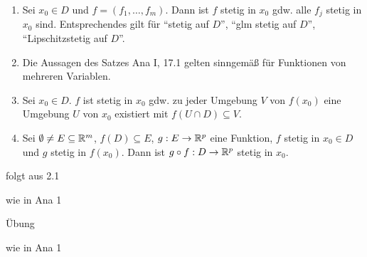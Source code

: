 \documentclass[a4paper,oneside,DIV15,BCOR12mm,chapterprefix=true,headings=onelinechapter]{scrbook}
\begin{document}
\begin{satz}
\begin{enumerate}
\item Sei $x_0 \in D$ und $f = (f_1,\ldots,f_m).$ Dann ist $f$ stetig in $x_0$ gdw. alle $f_j$ stetig in $x_0$ sind. Entsprechendes gilt für "`stetig auf $D$"', "`glm stetig auf $D$"', "`Lipschitzstetig auf $D$"'.
\item Die Aussagen des Satzes Ana I, 17.1 gelten sinngemäß für Funktionen von mehreren Variablen.
\item Sei $x_0 \in D$. $f$ ist stetig in $x_0$ gdw. zu jeder Umgebung $V$ von $f(x_0)$ eine Umgebung $U$ von $x_0$ existiert mit $f(U \cap D) \subseteq V$.
\item Sei $\emptyset \ne E \subseteq \mathbb{R}^m$, $f(D) \subseteq E$, $g: E \to \mathbb{R}^p$ eine Funktion, $f$ stetig in $x_0 \in D$ und $g$ stetig in $f(x_0)$. Dann ist $g \circ f: D \to \mathbb{R}^p$ stetig in $x_0$.
\end{enumerate}
\end{satz}

\begin{beweise}
\item folgt aus 2.1
\item wie in Ana 1
\item Übung
\item wie in Ana 1
\end{beweise}
\end{document}
